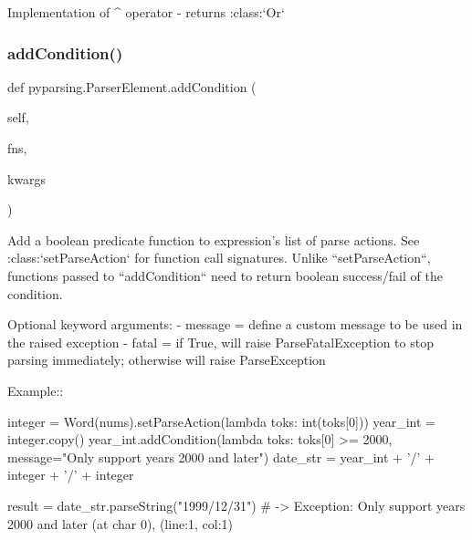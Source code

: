 \begin{DoxyVerb}Implementation of ^ operator - returns :class:`Or`
\end{DoxyVerb}
 \mbox{\label{classpyparsing_1_1ParserElement_a9fce1e8f3c0c4693eb5cd60223b0a5fc}} 
\subsubsection{\texorpdfstring{add\+Condition()}{addCondition()}}
{\footnotesize\ttfamily def pyparsing.\+Parser\+Element.\+add\+Condition (\begin{DoxyParamCaption}\item[{}]{self,  }\item[{}]{fns,  }\item[{}]{kwargs }\end{DoxyParamCaption})}

\begin{DoxyVerb}Add a boolean predicate function to expression's list of parse actions. See
:class:`setParseAction` for function call signatures. Unlike ``setParseAction``,
functions passed to ``addCondition`` need to return boolean success/fail of the condition.

Optional keyword arguments:
- message = define a custom message to be used in the raised exception
- fatal   = if True, will raise ParseFatalException to stop parsing immediately; otherwise will raise ParseException

Example::

    integer = Word(nums).setParseAction(lambda toks: int(toks[0]))
    year_int = integer.copy()
    year_int.addCondition(lambda toks: toks[0] >= 2000, message="Only support years 2000 and later")
    date_str = year_int + '/' + integer + '/' + integer

    result = date_str.parseString("1999/12/31")  # -> Exception: Only support years 2000 and later (at char 0), (line:1, col:1)
\end{DoxyVerb}
 \mbox{\label{classpyparsing_1_1ParserElement_a21f4bd9d7b1c9e8c18b94e4f8d2b1951}} 
